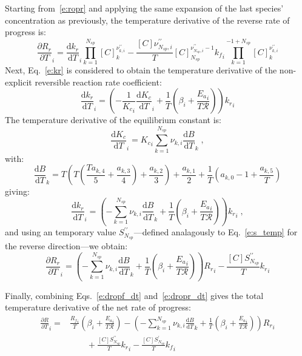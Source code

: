 \documentclass[12pt]{article}
\newcommand{\ns}{\ensuremath{{N_{sp}}}}
\newcommand{\Ru}{\ensuremath{\mathcal{R}}}
\begin{document}
Starting from~\eqref{e:ropr} and applying the same expansion of the last species' concentration as previously, the temperature derivative of the reverse rate of progress is:
\begin{equation}
 \frac{\partial {R_r} }{\partial T }_{i} = \frac{\text{d} {k_r} }{\text{d} T }_{i} \prod_{k=1}^{\ns} [C]_{k}^{\nu^{\prime\prime}_{k,i}} - \frac{[C] \nu^{\prime\prime}_{\ns,i}}{T} [C]_{\ns}^{\nu^{\prime\prime}_{\ns,i} - 1} {k_f}_{i} \prod_{k=1}^{-1 + \ns} [C]_{k}^{\nu^{\prime\prime}_{k,i}}
\end{equation}
Next, Eq.~\eqref{e:kr} is considered to obtain the temperature derivative of the non-explicit reversible reaction rate coefficient:
\begin{equation}
 \frac{\text{d} {k_r} }{\text{d} T }_{i} = \left(- \frac{1}{{K_c}_{i}} \frac{\text{d} {K_c} }{\text{d} T }_{i} + \frac{1}{T} \left(\beta_{i} + \frac{{E_{a}}_{i}}{T \Ru}\right)\right) {k_r}_{i}
\end{equation}
The temperature derivative of the equilibrium constant is:
\begin{equation}
 \frac{\text{d} {K_c} }{\text{d} T }_{i} = {K_c}_{i} \sum_{k=1}^{\ns} \nu_{k,i} \frac{\text{d} B }{\text{d} T }_{k} \;,
\end{equation}
with:
\begin{equation}
 \frac{\text{d} B }{\text{d} T }_{k} = T \left(T \left(\frac{T a_{k,4}}{5} + \frac{a_{k,3}}{4}\right) + \frac{a_{k,2}}{3}\right) + \frac{a_{k,1}}{2} + \frac{1}{T} \left(a_{k,0} - 1 + \frac{a_{k,5}}{T}\right)
\end{equation}
giving:
\begin{equation}
\label{e:dkr_dt}
\frac{\text{d} {k_r} }{\text{d} T }_{i} = \left(- \sum_{k=1}^{\ns} \nu_{k,i} \frac{\text{d} B }{\text{d} T }_{k} + \frac{1}{T} \left(\beta_{i} + \frac{{E_{a}}_{i}}{T \Ru}\right)\right) {k_r}_{i} \;,
\end{equation}
and using an temporary value $S^{\prime\prime}_{\ns}$---defined analagously to Eq.~\eqref{e:s_temp} for the reverse direction---we obtain:
\begin{equation}
\label{e:dropr_dt}
\frac{\partial {R_r} }{\partial T }_{i} = \left(- \sum_{k=1}^{\ns} \nu_{k,i} \frac{\text{d} B }{\text{d} T }_{k} + \frac{1}{T} \left(\beta_{i} + \frac{{E_{a}}_{i}}{T \Ru}\right)\right) {R_r}_{i} - \frac{[C] S^{\prime\prime}_{\ns}}{T} {k_r}_{i}
\end{equation}

Finally, combining Eqs.~\eqref{e:dropf_dt} and~\eqref{e:dropr_dt} gives the total temperature derivative of the net rate of progress:
\begin{align}
 \label{e:drop_dt}
 \frac{\partial R }{\partial T }_{i} =& \frac{{R_f}_{i}}{T} \left(\beta_{i} + \frac{{E_{a}}_{i}}{T \Ru}\right) - \left(- \sum_{k=1}^{\ns} \nu_{k,i} \frac{\text{d} B }{\text{d} T }_{k} + \frac{1}{T} \left(\beta_{i} + \frac{{E_{a}}_{i}}{T \Ru}\right)\right) {R_r}_{i} \nonumber \\
				      &\qquad + \frac{[C] S^{\prime\prime}_{\ns}}{T} {k_r}_{i} - \frac{[C] S^{\prime}_{\ns}}{T} {k_f}_{i}
\end{align}
\end{document}
